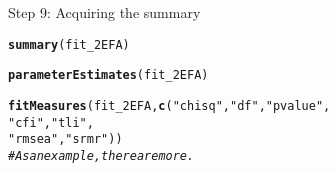 \documentclass[10pt]{beamer}\usepackage[]{graphicx}\usepackage[]{xcolor}
\makeatletter
\newcommand{\hlsng}[1]{\textcolor[rgb]{0.192,0.494,0.8}{#1}}%
\newcommand{\hlcom}[1]{\textcolor[rgb]{0.678,0.584,0.686}{\textit{#1}}}%
\newcommand{\hldef}[1]{\textcolor[rgb]{0.345,0.345,0.345}{#1}}%
\newcommand{\hlkwd}[1]{\textcolor[rgb]{0.737,0.353,0.396}{\textbf{#1}}}%
\newenvironment{kframe}{%
 \def\at@end@of@kframe{}%
 \ifinner\ifhmode%
  \def\at@end@of@kframe{\end{minipage}}%
  \begin{minipage}{\columnwidth}%
 \fi\fi%
 \def\FrameCommand##1{\hskip\@totalleftmargin \hskip-\fboxsep
 \colorbox{shadecolor}{##1}\hskip-\fboxsep
     \hskip-\linewidth \hskip-\@totalleftmargin \hskip\columnwidth}%
 \MakeFramed {\advance\hsize-\width
   \@totalleftmargin\z@ \linewidth\hsize
   \@setminipage}}%
 {\par\unskip\endMakeFramed%
 \at@end@of@kframe}
\newenvironment{knitrout}{}{} %
\makeatother
\begin{document}
%
\begin{frame}[fragile]{Step 9: Acquiring the summary}

\begin{knitrout}
\color{fgcolor}\begin{kframe}
\begin{alltt}
\hlkwd{summary}\hldef{(fit_2EFA)}

\hlkwd{parameterEstimates}\hldef{(fit_2EFA)}

\hlkwd{fitMeasures}\hldef{(fit_2EFA,} \hlkwd{c}\hldef{(}\hlsng{"chisq"}\hldef{,} \hlsng{"df"}\hldef{,} \hlsng{"pvalue"}\hldef{,}
                        \hlsng{"cfi"}\hldef{,} \hlsng{"tli"}\hldef{,}
                        \hlsng{"rmsea"}\hldef{,}\hlsng{"srmr"}\hldef{))}
\hlcom{# As an example, there are more.}
\end{alltt}
\end{kframe}
\end{knitrout}

\end{frame}
%
\end{document}
